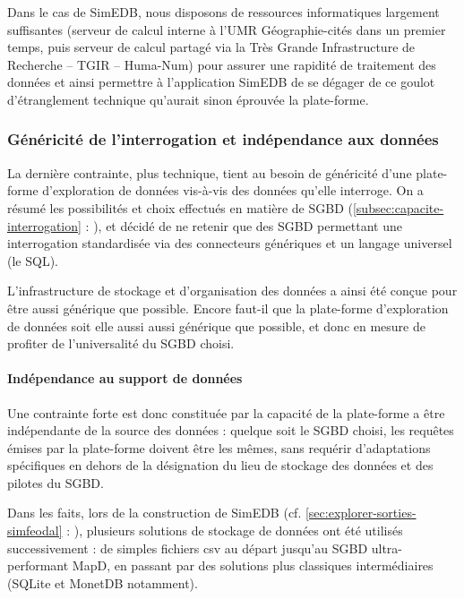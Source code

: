 Dans le cas de SimEDB, nous disposons de ressources informatiques largement suffisantes (serveur de calcul interne à l'UMR Géographie-cités dans un premier temps, puis serveur de calcul partagé via la \og Très Grande Infrastructure de Recherche\fg{} -- TGIR -- Huma-Num) pour assurer une rapidité de traitement des données et ainsi permettre à l'application SimEDB de se dégager de ce \og goulot d'étranglement\fg{} technique qu'aurait sinon éprouvée la plate-forme.

\subsubsection{Généricité de l'interrogation et indépendance aux données}

La dernière contrainte, plus technique, tient au besoin de généricité d'une plate-forme d'exploration de données vis-à-vis des données qu'elle interroge.
On a résumé les possibilités et choix effectués en matière de SGBD (\cref{subsec:capacite-interrogation} :  ), et décidé de ne retenir que des SGBD permettant une interrogation standardisée via des connecteurs génériques et un langage universel (le SQL).

L'infrastructure de stockage et d'organisation des données a ainsi été conçue pour être aussi générique que possible.
Encore faut-il que la plate-forme d'exploration de données soit elle aussi aussi générique que possible, et donc en mesure de profiter de l'universalité du SGBD choisi.

\paragraph*{Indépendance au support de données}
Une contrainte forte est donc constituée par la capacité de la plate-forme a être indépendante de la source des données : quelque soit le SGBD choisi, les requêtes émises par la plate-forme doivent être les mêmes, sans requérir d'adaptations spécifiques en dehors de la désignation du lieu de stockage des données	et des pilotes du SGBD.

Dans les faits, lors de la construction de SimEDB (cf. \cref{sec:explorer-sorties-simfeodal} : ), plusieurs solutions de stockage de données ont été utilisés successivement : de simples fichiers csv au départ jusqu'au SGBD ultra-performant MapD, en passant par des solutions plus classiques intermédiaires (SQLite et MonetDB notamment).

